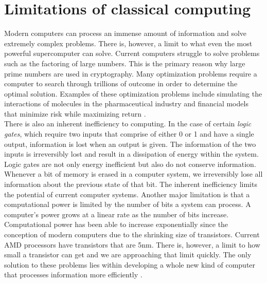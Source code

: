 \documentclass[12pt]{article}   	%
\begin{document}
\section{Limitations of classical computing}
Modern computers can process an immense amount of information and solve extremely complex problems. There is, however, a limit to what even the most powerful supercomputer can solve. Current computers struggle to solve problems such as the factoring of large numbers. This is the primary reason why large prime numbers are used in cryptography. Many optimization problems require a computer to search through trillions of outcome in order to determine the optimal solution. Examples of these optimization problems include simulating the interactions of molecules in the pharmaceutical industry and financial models that minimize risk while maximizing return \cite{1IBM}.\\
There is also an inherent inefficiency to computing. In the case of certain \textit{logic gates}, which require two inputs that comprise of either 0 or 1 and have a single output, information is lost when an output is given. The information of the two inputs is irreversibly lost and result in a dissipation of energy within the system.  Logic gates are not only energy inefficient but also do not conserve information. Whenever a bit of memory is erased in a computer system, we irreversibly lose all information about the previous state of that bit. The inherent inefficiency limits the potential of current computer systems. Another major limitation is that a computational power is limited by the number of bits a system can process. A computer's power grows at a linear rate as the number of bits increase. Computational power has been able to increase exponentially since the conception of modern computers due to the shrinking size of transistors. Current AMD processors have transistors that are 5nm. There is, however, a limit to how small a transistor can get and we are approaching that limit quickly. The only solution to these problems lies within developing a whole new kind of computer that processes information more efficiently \cite{5SCIAMER}. 
\end{document}
